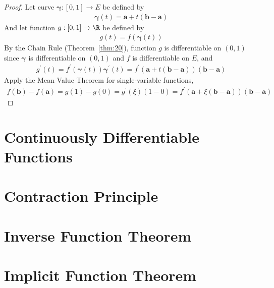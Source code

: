 \documentclass[thmcnt=section, 12pt]{elegantbook}
\begin{document}
\begin{proof}
    Let curve $\boldsymbol{\gamma}: [0,1] \to E$ be defined by 
    \begin{align*}
        \boldsymbol{\gamma}(t) = \mathbf{a} + t (\mathbf{b} - \mathbf{a})
    \end{align*}
    And let function $g: [0,1] \to \R$ be defined by 
    \begin{align*}
        g(t) = f(\boldsymbol{\gamma}(t))
    \end{align*}
    By the Chain Rule (Theorem~\ref{thm:20}), function $g$ is differentiable on $(0,1)$ since $\boldsymbol{\gamma}$ is differentiable on $(0,1)$ and $f$ is differentiable on $E$, and 
    \begin{align*}
        g^\prime(t) 
        = f^\prime(\boldsymbol{\gamma}(t)) \boldsymbol{\gamma}^\prime(t)
        = f^\prime(\mathbf{a} + t (\mathbf{b} - \mathbf{a})) (\mathbf{b} - \mathbf{a})
    \end{align*}
    Apply the Mean Value Theorem for single-variable functions, 
    \begin{align*}
        f(\mathbf{b}) - f(\mathbf{a}) = g(1) - g(0) = g^\prime(\xi) (1 - 0)
        = f^\prime(\mathbf{a} + \xi (\mathbf{b} - \mathbf{a})) (\mathbf{b} - \mathbf{a})
    \end{align*}
\end{proof}


\section{Continuously Differentiable Functions}


\section{Contraction Principle}


\section{Inverse Function Theorem}


\section{Implicit Function Theorem}

\end{document}
